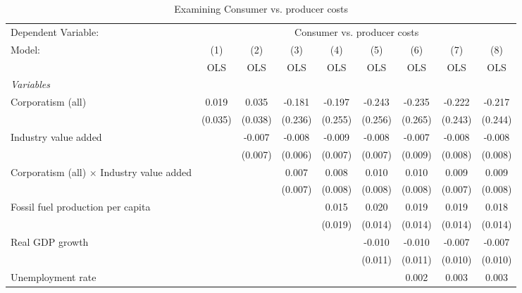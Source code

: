 
\begin{table}[htbp]
   \caption{Examining Consumer vs. producer costs}
   \centering
   \begin{tabular}{lcccccccc}
      \toprule
      Dependent Variable: & \multicolumn{8}{c}{Consumer vs. producer costs}\\
      Model:                                           & (1)     & (2)     & (3)     & (4)     & (5)     & (6)     & (7)     & (8)\\  
                                                       &  OLS    & OLS     & OLS     & OLS     & OLS     & OLS     & OLS     & OLS\\  
      \midrule
      \emph{Variables}\\
      Corporatism (all)                                & 0.019   & 0.035   & -0.181  & -0.197  & -0.243  & -0.235  & -0.222  & -0.217\\   
                                                       & (0.035) & (0.038) & (0.236) & (0.255) & (0.256) & (0.265) & (0.243) & (0.244)\\   
      Industry value added                             &         & -0.007  & -0.008  & -0.009  & -0.008  & -0.007  & -0.008  & -0.008\\   
                                                       &         & (0.007) & (0.006) & (0.007) & (0.007) & (0.009) & (0.008) & (0.008)\\   
      Corporatism (all) $\times$ Industry value added  &         &         & 0.007   & 0.008   & 0.010   & 0.010   & 0.009   & 0.009\\   
                                                       &         &         & (0.007) & (0.008) & (0.008) & (0.008) & (0.007) & (0.008)\\   
      Fossil fuel production per capita                &         &         &         & 0.015   & 0.020   & 0.019   & 0.019   & 0.018\\   
                                                       &         &         &         & (0.019) & (0.014) & (0.014) & (0.014) & (0.014)\\   
      Real GDP growth                                  &         &         &         &         & -0.010  & -0.010  & -0.007  & -0.007\\   
                                                       &         &         &         &         & (0.011) & (0.011) & (0.010) & (0.010)\\   
      Unemployment rate                                &         &         &         &         &         & 0.002   & 0.003   & 0.003\\   

\end{tabular}
\end{table}
